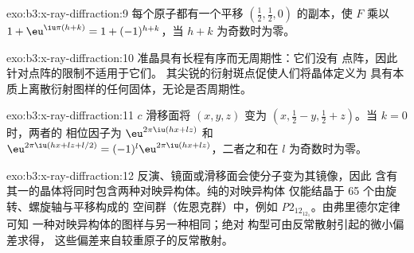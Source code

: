 \begin{solution}{exo:b3:x-ray-diffraction:9}
每个原子都有一个平移 $(\frac12,\frac12,0)$ 的副本，使 $F$ 乘以 $1 +
\eu^{\iu\pi(h+k)} = 1 + (-1)^{h+k}$，当 $h + k$ 为奇数时为零。
\end{solution}

\begin{solution}{exo:b3:x-ray-diffraction:10}
准晶具有长程有序而无周期性：它们没有
点阵，因此针对点阵的限制不适用于它们。
其尖锐的衍射斑点促使人们将晶体定义为
具有本质上离散衍射图样的任何固体，无论是否周期性。
\end{solution}

\begin{solution}{exo:b3:x-ray-diffraction:11}
$c$ 滑移面将 $(x, y, z)$ 变为 $(x, \frac12 - y, \frac12 + z)$。当 $k = 0$ 时，两者的
相位因子为 $\eu^{2\pi\iu(hx + lz)}$ 和 $\eu^{2\pi\iu(hx + lz + l/2)} = (-1)^l
\eu^{2\pi\iu(hx+lz)}$，二者之和在 $l$ 为奇数时为零。
\end{solution}

\begin{solution}{exo:b3:x-ray-diffraction:12}
反演、镜面或滑移面会使分子变为其镜像，因此
含有其一的晶体将同时包含两种对映异构体。纯的对映异构体
仅能结晶于 65 个由旋转、螺旋轴与平移构成的
空间群（佐恩克群）中，例如 \textit{P}$2_12_12_1$。由弗里德尔定律可知
一种对映异构体的图样与另一种相同；绝对
构型可由反常散射引起的微小偏差求得，
这些偏差来自较重原子的反常散射。
\end{solution}

